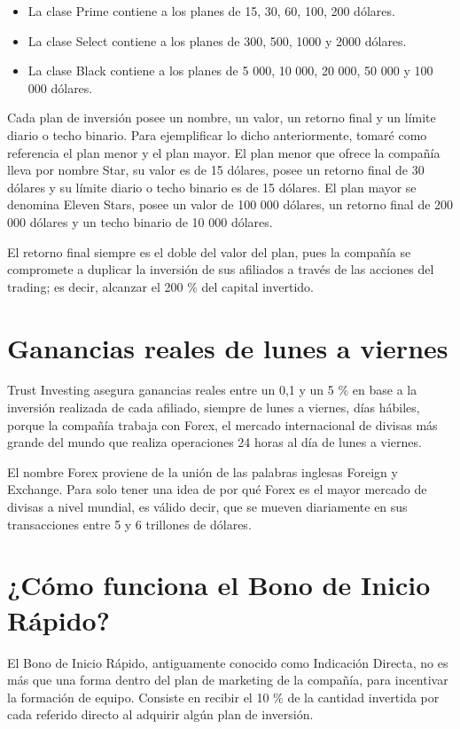 \documentclass[12pt,letterpaper]{article}
\begin{document}
	\begin{itemize}
		\item La clase Prime contiene a los planes de 15, 30, 60, 100, 200 dólares.
		\item La clase Select contiene a los planes de 300, 500, 1000 y 2000 dólares.
		\item La clase Black contiene a los planes de 5 000, 10 000, 20 000, 50 000 y 100 000 dólares.
	\end{itemize}

Cada plan de inversión posee un nombre, un valor, un retorno final y un límite diario o techo binario. Para ejemplificar lo dicho anteriormente, tomaré como referencia el plan menor y el plan mayor. El plan menor que ofrece la compañía lleva por nombre Star, su valor es de 15 dólares, posee un retorno final de 30 dólares y su límite diario o techo binario es de 15 dólares. El plan mayor se denomina Eleven Stars, posee un valor de 100 000 dólares, un retorno final de 200 000 dólares y un techo binario de 10 000 dólares.

El retorno final siempre es el doble del valor del plan, pues la compañía se compromete a duplicar la inversión de sus afiliados a través de las acciones del trading; es decir, alcanzar el 200 \% del capital invertido.

\section{Ganancias reales de lunes a viernes}
Trust Investing asegura ganancias reales entre un 0,1 y un 5 \% en base a la inversión realizada de cada afiliado, siempre de lunes a viernes, días hábiles, porque la compañía trabaja con Forex, el mercado internacional de divisas más grande del mundo que realiza operaciones 24 horas al día de lunes a viernes.

El nombre Forex proviene de la unión de las palabras inglesas Foreign y Exchange. Para solo tener una idea de por qué Forex es el mayor mercado de divisas a nivel mundial, es válido decir, que se mueven diariamente en sus transacciones entre 5 y 6 trillones de dólares.

\section{¿Cómo funciona el Bono de Inicio Rápido?}
El Bono de Inicio Rápido, antiguamente conocido como Indicación Directa, no es más que una forma dentro del plan de marketing de la compañía, para incentivar la formación de equipo. Consiste en recibir el 10 \% de la cantidad invertida por cada referido directo al adquirir algún plan de inversión.
\end{document}
